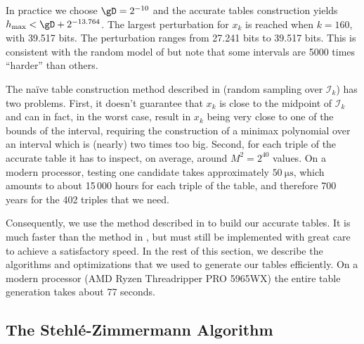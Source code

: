\documentclass[10pt, a4paper, twoside]{basestyle}
\begin{document}
In practice we choose $\gD = 2^{-10}$ and the accurate tables construction yields $h_{\text{max}} < \gD + 2^{-13.764}$.  The largest perturbation for $x_k$ is reached when $k = 160$, with 39.517 bits.  The perturbation ranges from 27.241 bits to 39.517 bits.  This is consistent with the random model of \cite{StehléZimmermann2005} but note that some intervals are 5000 times ``harder'' than others.

The naïve table construction method described in \cite{Gal1986} (random sampling over $\mathscr{I}_k$) has two problems.  First, it doesn't guarantee that $x_k$ is close to the midpoint of $\mathscr{I}_k$ and can in fact, in the worst case, result in $x_k$ being very close to one of the bounds of the interval, requiring the construction of a minimax polynomial over an interval which is (nearly) two times too big.  Second, for each triple of the accurate table it has to inspect, on average, around $M^2 = 2^{40}$ values.  On a modern processor, testing one candidate takes approximately $\SI{50}{\micro\second}$, which amounts to about 15\,000 hours for each triple of the table, and therefore 700 years for the 402 triples that we need.

Consequently, we use the method described in \cite{StehléZimmermann2005} to build our accurate tables.  It is much faster than the method in \cite{Gal1986}, but must still be implemented with great care to achieve a satisfactory speed.  In the rest of this section, we describe the algorithms and optimizations that we used to generate our tables efficiently.  On a modern processor (AMD Ryzen Threadripper PRO 5965WX) the entire table generation takes about 77 seconds.

\subsection*{The Stehlé-Zimmermann Algorithm}
\end{document}
